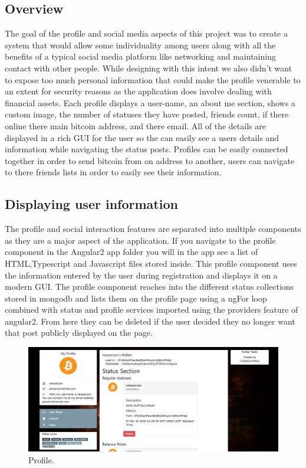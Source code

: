 \subsection{Overview}
The goal of the profile and social media aspects of this project was to create a system that would allow some individuality among users along with all the benefits of a typical social media platform like networking and maintaining contact with other people. While designing with this intent we also didn't want to expose too much personal information that could make the profile venerable to an extent for security reasons as the application does involve dealing with financial assets. Each profile displays a user-name, an about me section, shows a custom image, the number of statuses they have posted, friends count, if there online there main bitcoin address, and there email. All of the details are displayed in a rich GUI for the user so the can easily see a users details and information while navigating the status posts. Profiles can be easily connected together in order to send bitcoin from on address to another, users can navigate to there friends lists in order to easily see their information.

\subsection{Displaying user information}
The profile and social interaction features are separated into multiple components as they are a major aspect of the application. If you navigate to the profile component in the Angular2 app folder you will  in the app see a list of HTML,Typescript and Javascript files stored inside. This profile component uses the information entered by the user during registration and displays it on a modern GUI. The profile component reaches into the different status collections stored in mongodb and lists them on the profile page using a ngFor loop combined with status and profile services imported using the providers feature of angular2. From here they can be deleted if the user decided they no longer want that post publicly displayed on the page.

\begin{figure}[H]
\centering
\includegraphics[scale=0.55]{img/UserProfile.png}
\caption{Profile.}
\end{figure}

